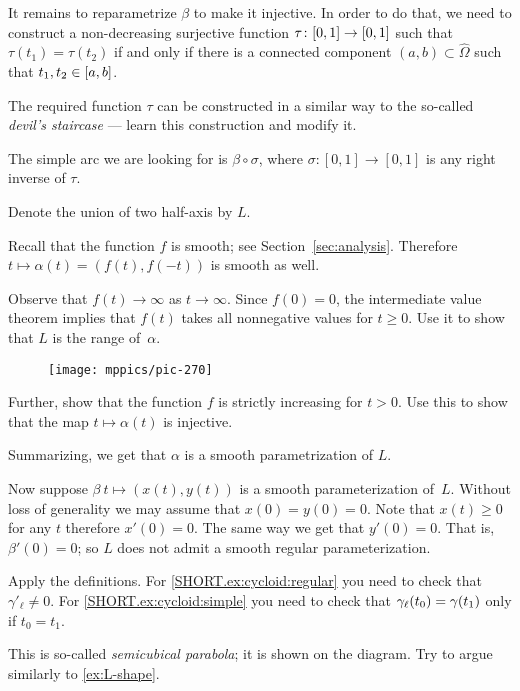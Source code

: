 It remains to reparametrize $\beta$ to make it injective.
In order to do that, we need to construct a non-decreasing surjective function $\tau\:[0,1]\z\to[0,1]$ such that 
$\tau(t_1)=\tau(t_2)$ if and only if there is a connected component $(a,b)\subset\hat \Omega$ such that $t_1,t_2\z\in [a,b]$.

The required function $\tau$ can be constructed in a similar way to the so-called \emph{devil's staircase} --- learn this construction and modify it.

The simple arc we are looking for is $\beta \circ \sigma$, where $\sigma:  [0,1]\to [0,1]$ is any right inverse of $\tau$.


Denote the union of two half-axis by $L$.

Recall that the function $f$ is smooth; see Section~\ref{sec:analysis}.
Therefore $t\mapsto \alpha(t)=(f(t),f(-t))$ is smooth as well.

Observe that $f(t)\to\infty$ as $t\to \infty$.
Since $f(0)=0$, the intermediate value theorem implies that $f(t)$ takes all nonnegative values for $t\ge 0$.
Use it to show that $L$ is the range of~$\alpha$.

\begin{wrapfigure}[12]{r}{24 mm}
\vskip-4mm
\centering
\texttt{[image: mppics/pic-270]}
\vskip0mm
\end{wrapfigure}

Further, show that the function $f$ is strictly increasing for $t> 0$.
Use this to show that the map $t\mapsto \alpha(t)$ is injective.

Summarizing, we get that $\alpha$ is a smooth parametrization of $L$. 

Now suppose $\beta\:t\mapsto (x(t),y(t))$ is a smooth parameterization of~$L$.
Without loss of generality we may assume that $x(0)=y(0)=0$.
Note that $x(t)\ge 0$ for any $t$ therefore $x'(0)=0$.
The same way we get that $y'(0)=0$.
That is, $\beta'(0)=0$;
so $L$ does not admit a smooth regular parameterization.

Apply the definitions.
For \ref{SHORT.ex:cycloid:regular} you need to check that $\gamma'_\ell\ne 0$.
For \ref{SHORT.ex:cycloid:simple} you need to check that $\gamma_\ell(t_0)\z=\gamma(t_1)$ only if $t_0=t_1$.

This is so-called \emph{semicubical parabola}; it is shown on the diagram.
Try to argue similarly to \ref{ex:L-shape}.


